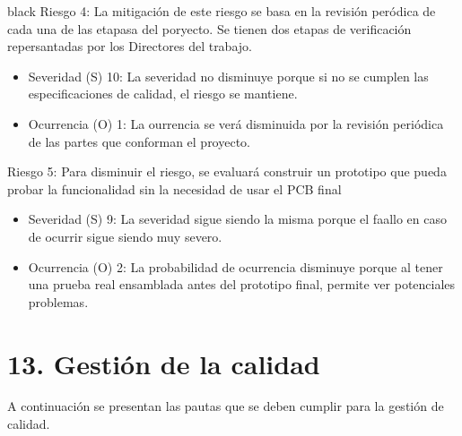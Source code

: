 \documentclass[11pt]{charter}
\begin{document}
\begin{consigna}{black}
Riesgo 4: La mitigación de este riesgo se basa en la revisión peródica de cada una de las etapasa del poryecto. Se tienen dos etapas de verificación repersantadas por los Directores del trabajo.
\begin{itemize}
	\item Severidad (S) 10: La severidad no disminuye porque si no se cumplen las especificaciones de calidad, el riesgo se mantiene.
	\item Ocurrencia (O) 1: La ourrencia se verá disminuida por la revisión periódica de las partes que conforman el proyecto.
\end{itemize}

Riesgo 5:  Para disminuir el riesgo, se evaluará construir un prototipo que pueda probar la funcionalidad sin la necesidad de usar el PCB final
\begin{itemize}
	\item Severidad (S) 9: La severidad sigue siendo la misma porque el faallo en caso de ocurrir sigue siendo muy severo.
	\item Ocurrencia (O) 2: La probabilidad de ocurrencia disminuye porque al tener una prueba real ensamblada antes del prototipo final, permite ver potenciales problemas.
\end{itemize}

\end{consigna}


\section{13. Gestión de la calidad}
\label{sec:calidad}

A continuación se presentan las pautas que se deben cumplir para la gestión de calidad.
\end{document}
